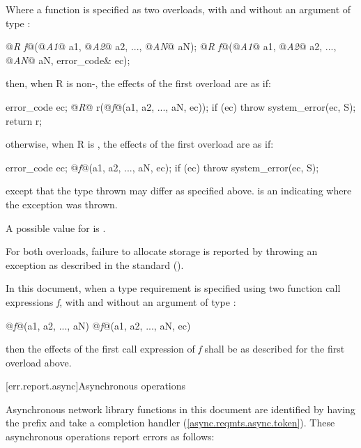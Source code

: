 \pnum
Where a function is specified as two overloads, with and without an argument of type :

\begin{codeblock}
@\textit{R f}@(@\textit{A1}@ a1, @\textit{A2}@ a2, ..., @\textit{AN}@ aN);
@\textit{R f}@(@\textit{A1}@ a1, @\textit{A2}@ a2, ..., @\textit{AN}@ aN, error_code& ec);
\end{codeblock}

\pnum
then, when R is non-, the effects of the first overload are as if:

\begin{codeblock}
error_code ec;
@\textit{R}@ r(@\textit{f}@(a1, a2, ..., aN, ec));
if (ec) throw system_error(ec, S);
return r;
\end{codeblock}

\pnum
otherwise, when R is , the effects of the first overload are as if:

\begin{codeblock}
error_code ec;
@\textit{f}@(a1, a2, ..., aN, ec);
if (ec) throw system_error(ec, S);
\end{codeblock}

\pnum
except that the type thrown may differ as specified above.  is an \ntbs indicating where the exception was thrown. \begin{note} A possible value for  is . \end{note}

\pnum
 For both overloads, failure to allocate storage is reported by throwing an exception as described in the \Cpp standard ().

\pnum
In this document, when a type requirement is specified using two function call expressions \textit{f}, with and without an argument  of type :

\begin{codeblock}
@\textit{f}@(a1, a2, ..., aN)
@\textit{f}@(a1, a2, ..., aN, ec)
\end{codeblock}

then the effects of the first call expression of \textit{f} shall be as described for the first overload above.



[err.report.async]{Asynchronous operations}

\pnum
Asynchronous network library functions in this document are identified by having the prefix  and take a completion handler (\ref{async.reqmts.async.token}). These asynchronous operations report errors as follows:

